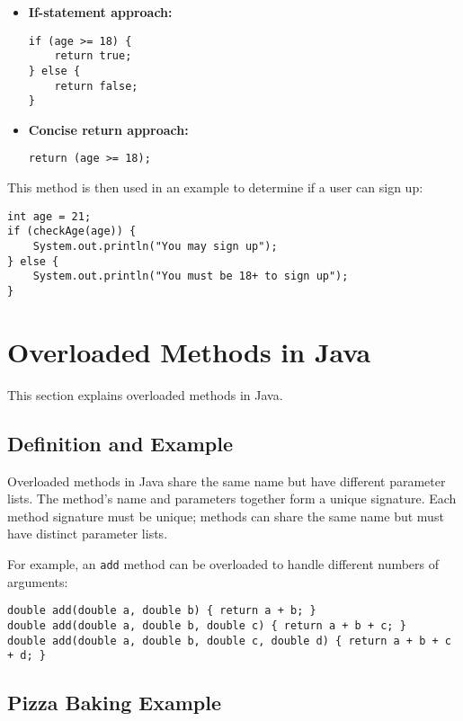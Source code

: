 \documentclass{article}
\begin{document}
\begin{itemize}
    \item \textbf{If-statement approach:}
    \begin{verbatim}
if (age >= 18) {
    return true;
} else {
    return false;
}
    \end{verbatim}
    \item \textbf{Concise return approach:}
    \begin{verbatim}
return (age >= 18);
\end{verbatim}
\end{itemize}

This method is then used in an example to determine if a user can sign up:

\begin{verbatim}
int age = 21; 
if (checkAge(age)) {
    System.out.println("You may sign up");
} else {
    System.out.println("You must be 18+ to sign up");
}
\end{verbatim}


\section{Overloaded Methods in Java}

This section explains overloaded methods in Java.

\subsection{Definition and Example}

Overloaded methods in Java share the same name but have different parameter lists. The method's name and parameters together form a unique signature.  Each method signature must be unique; methods can share the same name but must have distinct parameter lists.

For example, an \texttt{add} method can be overloaded to handle different numbers of arguments:

\begin{verbatim}
double add(double a, double b) { return a + b; }
double add(double a, double b, double c) { return a + b + c; }
double add(double a, double b, double c, double d) { return a + b + c + d; }
\end{verbatim}

\subsection{Pizza Baking Example}
\end{document}
